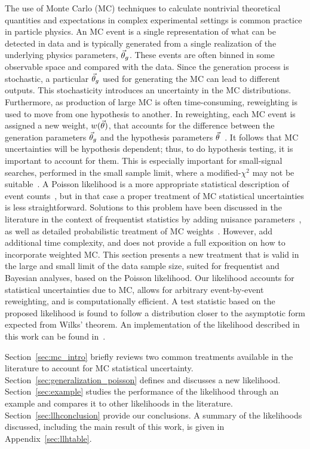 The use of Monte Carlo (MC) techniques to calculate nontrivial theoretical quantities and expectations in complex experimental settings is common practice in particle physics.
An MC event is a single representation of what can be detected in data and is typically generated from a single realization of the underlying physics parameters, $\vec{\theta}_g$.
These events are often binned in some observable space and compared with the data.
Since the generation process is stochastic, a particular $\vec{\theta}_g$ used for generating the MC can lead to different outputs.
This stochasticity introduces an uncertainty in the MC distributions.
Furthermore, as production of large MC is often time-consuming, reweighting is used to move from one hypothesis to another.
In reweighting, each MC event is assigned a new weight, $w(\vec{\theta})$, that accounts for the difference between the generation parameters $\vec{\theta}_g$ and the hypothesis parameters $\vec{\theta}$~\cite{Gainer:2014bta}.
It follows that MC uncertainties will be hypothesis dependent; thus, to do hypothesis testing, it is important to account for them.
This is especially important for small-signal searches, performed in the small sample limit, where a modified-$\chi^2$ may not be suitable~\cite{Lyons:1986em}.
A Poisson likelihood is a more appropriate statistical description of event counts~\cite{poisson1837recherches}, but in that case a proper treatment of MC statistical uncertainties is less straightforward.
Solutions to this problem have been discussed in the literature in the context of frequentist statistics by adding nuisance parameters~\cite{Barlow:1993dm,Cranmer:2012sba,Chirkin:2013lya}, as well as detailed probabilistic treatment of MC weights~\cite{Glusenkamp:2017rlp}.
However, \cite{Barlow:1993dm, Chirkin:2013lya, Glusenkamp:2017rlp} add additional time complexity, and \cite{Cranmer:2012sba} does not provide a full exposition on how to incorporate weighted MC.
This section presents a new treatment that is valid in the large and small limit of the data sample size, suited for frequentist and Bayesian analyses, based on the Poisson likelihood.
Our likelihood accounts for statistical uncertainties due to MC, allows for arbitrary event-by-event reweighting, and is computationally efficient.
A test statistic based on the proposed likelihood is found to follow a distribution closer to the asymptotic form expected from Wilks' theorem.
An implementation of the likelihood described in this work can be found in~\cite{MCLLH}.

Section~\ref{sec:mc_intro} briefly reviews two common treatments available in the literature to account for MC statistical uncertainty.
Section~\ref{sec:generalization_poisson} defines and discusses a new likelihood.
Section~\ref{sec:example} studies the performance of the likelihood through an example and compares it to other likelihoods in the literature.
Section~\ref{sec:llhconclusion} provide our conclusions.
A summary of the likelihoods discussed, including the main result of this work, is given in Appendix~\ref{sec:llhtable}.

